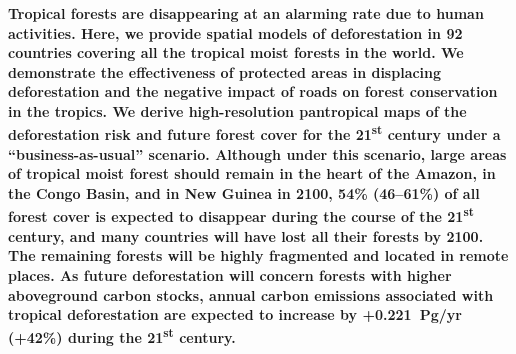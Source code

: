 \documentclass[
  12pt,
]{article}
\begin{document}
\textbf{Tropical forests are disappearing at an alarming rate due to human activities. Here, we provide spatial models of deforestation in 92 countries covering all the tropical moist forests in the world. We demonstrate the effectiveness of protected areas in displacing deforestation and the negative impact of roads on forest conservation in the tropics. We derive high-resolution pantropical maps of the deforestation risk and future forest cover for the 21\textsuperscript{st} century under a ``business-as-usual'' scenario. Although under this scenario, large areas of tropical moist forest should remain in the heart of the Amazon, in the Congo Basin, and in New Guinea in 2100, 54\% (46--61\%) of all forest cover is expected to disappear during the course of the 21\textsuperscript{st} century, and many countries will have lost all their forests by 2100. The remaining forests will be highly fragmented and located in remote places. As future deforestation will concern forests with higher aboveground carbon stocks, annual carbon emissions associated with tropical deforestation are expected to increase by +0.221~Pg/yr (+42\%) during the 21\textsuperscript{st} century.}\\



\newpage

\end{document}
